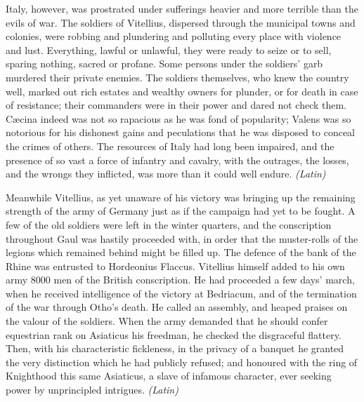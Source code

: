 Italy, however, was prostrated under sufferings heavier and more terrible than the evils of war. The soldiers of Vitellius, dispersed through the municipal towns and colonies, were robbing and plundering and polluting every place with violence and lust. Everything, lawful or unlawful, they were ready to seize or to sell, sparing nothing, sacred or profane. Some persons under the soldiers' garb murdered their private enemies. The soldiers themselves, who knew the country well, marked out rich estates and wealthy owners for plunder, or for death in case of resistance; their commanders were in their power and dared not check them. Cæcina indeed was not so rapacious as he was fond of popularity; Valens was so notorious for his dishonest gains and peculations that he was disposed to conceal the crimes of others. The resources of Italy had long been impaired, and the presence of so vast a force of infantry and cavalry, with the outrages, the losses, and the wrongs they inflicted, was more than it could well endure. \emph{(Latin)}


Meanwhile Vitellius, as yet unaware of his victory was bringing up the remaining strength of the army of Germany just as if the campaign had yet to be fought. A few of the old soldiers were left in the winter quarters, and the conscription throughout Gaul was hastily proceeded with, in order that the muster-rolls of the legions which remained behind might be filled up. The defence of the bank of the Rhine was entrusted to Hordeonius Flaccus. Vitellius himself added to his own army 8000 men of the British conscription. He had proceeded a few days' march, when he received intelligence of the victory at Bedriacum, and of the termination of the war through Otho's death. He called an assembly, and heaped praises on the valour of the soldiers. When the army demanded that he should confer equestrian rank on Asiaticus his freedman, he checked the disgraceful flattery. Then, with his characteristic fickleness, in the privacy of a banquet he granted the very distinction which he had publicly refused; and honoured with the ring of Knighthood this same Asiaticus, a slave of infamous character, ever seeking power by unprincipled intrigues. \emph{(Latin)}



